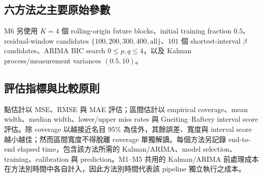 \subsection{六方法之主要原始參數}
\label{subsec:method-parameters}

\begin{table}[htbp]
\centering
\caption{六種方法的主要原始超參數}
\label{tab:original-hyperparameters}
\end{table}

M6 另使用 $K=4$ 個 rolling-origin future blocks、initial training fraction $0.5$、residual-window candidates $\{100,200,300,400,\mathrm{all}\}$、$101$ 個 shortest-interval $\beta$ candidates、ARIMA BIC search $0\leq p,q\leq4$，以及 Kalman process/measurement variances $(0.5,10)$。

\subsection{評估指標與比較原則}
\label{subsec:evaluation-metrics}

點估計以 MSE、RMSE 與 MAE 評估；區間估計以 empirical coverage、mean width、median width、lower/upper miss rates 與 Gneiting--Raftery interval score 評估。除 coverage 以越接近名目 $95\%$ 為佳外，其餘誤差、寬度與 interval score 越小越佳；然而區間寬度不得脫離 coverage 單獨解讀。每個方法另記錄 end-to-end elapsed time，包含該方法所需的 Kalman/ARIMA、model selection、training、calibration 與 prediction。M1--M5 共用的 Kalman/ARIMA 前處理成本在方法別時間中各自計入，因此方法別時間代表該 pipeline 獨立執行之成本。

